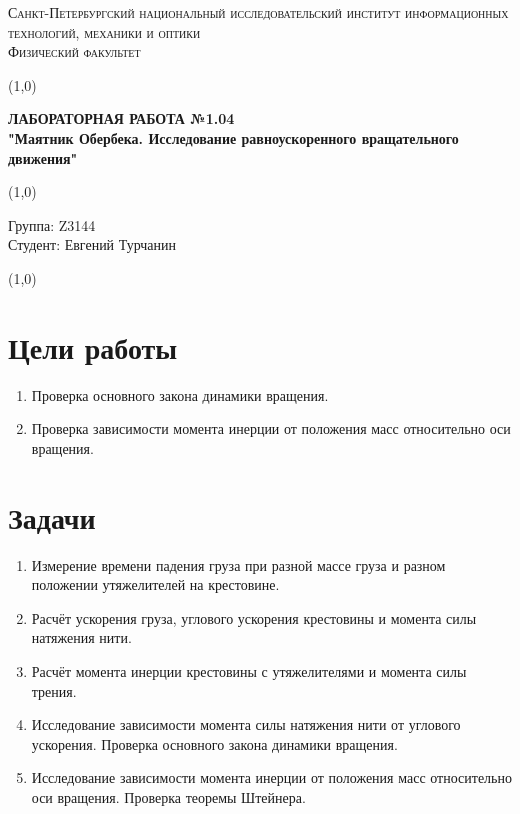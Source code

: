 \documentclass[a4paper]{article}
\begin{document}
\begin{center}
\textsc{Санкт-Петербургский национальный исследовательский институт информационных технологий, механики и оптики\\[3mm]
Физический факультет} \\[3mm]

\end{center}
\vspace{5mm}
\line(1,0){\textwidth}
\begin{center}
\textbf{ЛАБОРАТОРНАЯ РАБОТА №1.04\\}
\textbf{"Маятник Обербека. Исследование равноускоренного вращательного движения"}
\end{center}
\vspace{2mm}
\line(1,0){\textwidth}
\vspace{5mm}
\begin{minipage}{0.4\textwidth}
    Группа: Z3144 \\
    Студент: Евгений Турчанин\\
    \vspace{1mm}
\end{minipage}
\hfill
\vspace{1mm}
\line(1,0){\textwidth}


\section{Цели работы}
\begin{enumerate}
    \item Проверка основного закона динамики вращения.
    \item Проверка зависимости момента инерции от положения масс относительно оси вращения.
\end{enumerate}

\section{Задачи}
\begin{enumerate}
    \item Измерение времени падения груза при разной массе груза и разном положении утяжелителей на крестовине.
    \item Расчёт ускорения груза, углового ускорения крестовины и момента силы натяжения нити.
    \item Расчёт момента инерции крестовины с утяжелителями и момента силы трения.
    \item Исследование зависимости момента силы натяжения нити от углового ускорения. Проверка основного закона динамики вращения.
    \item Исследование зависимости момента инерции от положения масс относительно оси вращения. Проверка теоремы Штейнера.
\end{enumerate}
\end{document}
